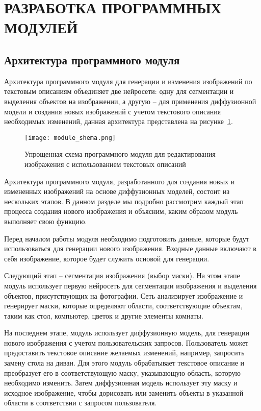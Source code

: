 \section{РАЗРАБОТКА ПРОГРАММНЫХ МОДУЛЕЙ}
\label{sec:dev}

\subsection{Архитектура программного модуля}

Архитектура программного модуля для генерации и изменения 
изображений по текстовым описаниям объединяет две нейросети: одну для 
сегментации и выделения объектов на изображении, а другую – для 
применения диффузионной модели и создания новых изображений с учетом 
текстового описания необходимых изменений, данная архитектура 
представлена на рисунке~\ref{dev::shema}.

\begin{figure}[ht]
    \centering
    \texttt{[image: module\_shema.png]}
    \caption{Упрощенная схема программного модуля для редактирования изображения с использованием текстовых описаний}
    \label{dev::shema}
\end{figure}

Архитектура программного модуля, разработанного для создания новых 
и измененных изображений на основе диффузионных моделей, состоит из 
нескольких этапов. В данном разделе мы подробно рассмотрим каждый этап 
процесса создания нового изображения и объясним, каким образом модуль 
выполняет свою функцию.

Перед началом работы модуля необходимо подготовить данные, 
которые будут использоваться для генерации нового изображения. Входные 
данные включают в себя изображение, которое будет служить основой для 
генерации.

Следующий этап – сегментация изображения (выбор маски). На этом 
этапе модуль использует первую нейросеть для сегментации изображения и 
выделения объектов, присутствующих на фотографии. Сеть анализирует 
изображение и генерирует маски, которые определяют области, 
соответствующие объектам, таким как стол, компьютер, цветок и другие 
элементы комнаты.

На последнем этапе, модуль использует диффузионную модель, для 
генерации нового изображения с учетом пользовательских запросов. 
Пользователь может предоставить текстовое описание желаемых изменений, 
например, запросить замену стола на диван. Для этого модуль обрабатывает 
текстовое описание и преобразует его в соответствующую маску, 
указывающую область, которую необходимо изменить. Затем диффузионная 
модель использует эту маску и исходное изображение, чтобы дорисовать или 
заменить объекты в указанной области в соответствии с запросом 
пользователя.

